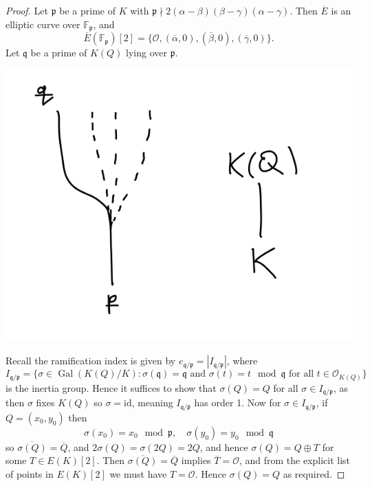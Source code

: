 \documentclass[a4paper]{article}
\theoremstyle{plain}
\theoremstyle{remark}
\theoremstyle{definition}
\DeclareMathOperator{\Gal}{Gal}
\newcommand{\id}{\mathrm{id}}
\newcommand{\p}{\mathfrak{p}}
\newcommand{\q}{\mathfrak{q}}
\renewcommand{\O}{\mathcal{O}}
\newcommand{\F}{\mathbb{F}}
\begin{document}
\begin{proof}
    Let $\p$ be a prime of $K$ with
    $\p\nmid 2(\alpha-\beta)(\beta-\gamma)(\alpha-\gamma)$. Then $\overline E$
    is an elliptic curve over $\F_\p$, and
    \begin{equation*}
        \overline E(\F_\p)[2]
            = \{\O,(\overline\alpha,0),(\overline\beta,0),(\overline\gamma,0)\}.
    \end{equation*}
    Let $\q$ be a prime of $K(Q)$ lying over $\p$.
    \begin{center}
        \includegraphics[scale=0.25]{lyingover}
    \end{center}
    Recall the ramification index is given by $e_{\q/\p}=|I_{\q/\p}|$, where
    \begin{equation*}
        I_{\q/\p} = \{\sigma\in\Gal(K(Q)/K)
            :\text{$\sigma(\q)=\q$ and $\sigma(t)=t\mod\q$ for all
            $t\in\O_{K(Q)}$}\}
    \end{equation*}
    is the inertia group. Hence it suffices to show that $\sigma(Q)=Q$ for all
    $\sigma\in I_{\q/\p}$, as then $\sigma$ fixes $K(Q)$ so $\sigma=\id$,
    meaning $I_{\q/\p}$ has order 1. Now for $\sigma\in I_{\q/\p}$, if
    $Q=(x_0,y_0)$ then
    \begin{equation*}
        \sigma(x_0)=x_0\mod\p,\quad\sigma(y_0)=y_0\mod\q
    \end{equation*}
    so $\overline{\sigma(Q)}=\overline Q$, and $2\sigma(Q)=\sigma(2Q)=2Q$, and
    hence $\sigma(Q)=Q\oplus T$ for some $T\in E(K)[2]$. Then
    $\overline{\sigma(Q)}=\overline Q$ implies $\overline T=\O$, and from the
    explicit list of points in $E(K)[2]$ we must have $T=\O$. Hence
    $\sigma(Q)=Q$ as required.
\end{proof}
\end{document}
